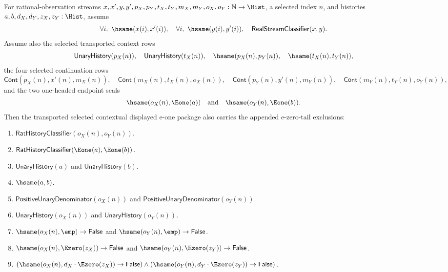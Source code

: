 \begin{theorem}
\label{thm:real-stream-classifier-transported-contextual-displayed-e1-appended-tail-exclusion-package}
For rational-observation streams
$x,x',y,y',p_X,p_Y,t_X,t_Y,m_X,m_Y,o_X,o_Y:\mathbb{N}\to\Hist$, a selected
index $n$, and histories $a,b,d_X,d_Y,z_X,z_Y:\Hist$, assume
$$
\forall i,\ \hsame(x(i),x'(i)),\quad
\forall i,\ \hsame(y(i),y'(i)),\quad
\mathsf{RealStreamClassifier}(x,y).
$$
Assume also the selected transported context rows
$$
\mathsf{UnaryHistory}(p_X(n)),\quad
\mathsf{UnaryHistory}(t_X(n)),\quad
\hsame(p_X(n),p_Y(n)),\quad
\hsame(t_X(n),t_Y(n)),
$$
the four selected continuation rows
$$
\mathsf{Cont}(p_X(n),x'(n),m_X(n)),\quad
\mathsf{Cont}(m_X(n),t_X(n),o_X(n)),
\quad
\mathsf{Cont}(p_Y(n),y'(n),m_Y(n)),\quad
\mathsf{Cont}(m_Y(n),t_Y(n),o_Y(n)),
$$
and the two one-headed endpoint seals
$$
\hsame(o_X(n),\Eone(a))\quad\text{and}\quad \hsame(o_Y(n),\Eone(b)).
$$
Then the transported selected contextual displayed e-one package also carries the
appended e-zero-tail exclusions:
\begin{enumerate}
\item $\mathsf{RatHistoryClassifier}(o_X(n),o_Y(n))$.
\item $\mathsf{RatHistoryClassifier}(\Eone(a),\Eone(b))$.
\item $\mathsf{UnaryHistory}(a)$ and $\mathsf{UnaryHistory}(b)$.
\item $\hsame(a,b)$.
\item $\mathsf{PositiveUnaryDenominator}(o_X(n))$ and
$\mathsf{PositiveUnaryDenominator}(o_Y(n))$.
\item $\mathsf{UnaryHistory}(o_X(n))$ and $\mathsf{UnaryHistory}(o_Y(n))$.
\item $\hsame(o_X(n),\emp)\to\mathsf{False}$ and
$\hsame(o_Y(n),\emp)\to\mathsf{False}$.
\item $\hsame(o_X(n),\Ezero(z_X))\to\mathsf{False}$ and
$\hsame(o_Y(n),\Ezero(z_Y))\to\mathsf{False}$.
\item $(\hsame(o_X(n),d_X\cdot\Ezero(z_X))\to\mathsf{False})\land
(\hsame(o_Y(n),d_Y\cdot\Ezero(z_Y))\to\mathsf{False})$.
\end{enumerate}
\end{theorem}
